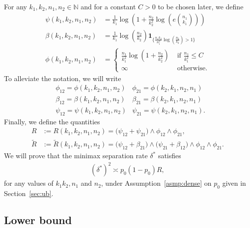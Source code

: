 \documentclass{article}
\newcommand{\one}{\mathbf{1}}
\begin{document}
For any $k_1,k_2, n_1, n_2 \in \mathbb N$ and for a constant $C > 0$ to be chosen later, we define 
\begin{align}
    \psi(k_1,k_2,n_1,n_2) &= \frac{1}{k_1} \log\left(1+ \frac{n_2}{k_2^2} \log\left(e{n_1 \choose k_1}\right)\right) \label{eq_def_psi}\\[5pt]
    \beta(k_1, k_2, n_1, n_2) &= \frac{1}{k_1}\log\left(\frac{n_2}{k_2}\right)\one_{\{\frac{n_1k_2}{n_1^2}\log\left(\frac{n_2}{k_2}\right) > 1\}} \label{eq_def_nu} \\[5pt]
    \phi(k_1,k_2, n_1,n_2) &= \begin{cases}
        \frac{n_1}{k_1^2} \log\left(1+\frac{n_2}{k_2^2}\right)&  \text{ if } \frac{n_1}{k_1^2} \leq C\\
         \infty & \text{ otherwise.}
    \end{cases}\label{eq_def_phi}
\end{align}
To alleviate the notation, we will write
\begin{align*}
    &\phi_{12} = \phi(k_1,k_2, n_1,n_2)
    &\phi_{21} = \phi(k_2,k_1, n_2,n_1)\,\,\\
    &\beta_{12} = \beta(k_1,k_2, n_1,n_2)
    &\beta_{21} = \beta(k_2,k_1, n_2,n_1)\,\, \\
    &\psi_{12} = \psi(k_1,k_2, n_1,n_2)
    &\psi_{21} = \psi(k_2,k_1, n_2,n_1).
\end{align*}
Finally, we define the quantities
\begin{align}
R &:= R(k_1, k_2, n_1, n_2) =\big(\psi_{12} + \psi_{21}\big) \land \phi_{12}  \land \phi_{21}, \label{eq_rate} \\
\tilde{R} &:= \tilde{R}(k_1, k_2, n_1, n_2) = \big(\psi_{12} + \beta_{21}\big) \land \big(\psi_{21} + \beta_{12}\big) \land \phi_{12} \land \phi_{21}.
\end{align}
We will prove that the minimax separation rate $\delta^*$ satisfies 
\begin{align*}
    (\delta^*)^2 \asymp p_0(1-p_0) R,
\end{align*}
for any values of $k_1k_2,n_1$ and $n_2$, under Assumption~\ref{asmp:dense} on $p_0$ given in Section~\ref{sec:ub}.

\subsection{Lower bound}\label{sec:lb}
 
\end{document}
